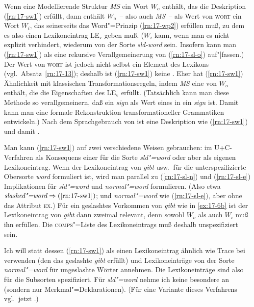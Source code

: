 \documentclass[output=paper]{LSP/langsci}
\begin{document}
\randnum\label{rn:17-82}Wenn eine Modellierende Struktur \textit{MS} ein Wort
$W_o$ enthält, das die Deskription (\ref{rn:17-sw1}) erfüllt, dann
enthält $W_o$~-- also auch \textit{MS}~-- als Wert von \textsc{wort} ein Wort
$W_i$, das seinerseits das Word"=Prinzip (\ref{rn:17-wp2}) erfüllen muß, zu dem es
also einen Lexikoneintrag LE$_\mathrm{v}$ geben muß. ($W_i$ kann, wenn man
es nicht explizit verhindert, wiederum von der Sorte \textit{sld-word}
sein. Insofern kann man (\ref{rn:17-sw1}) als eine rekursive Verallgemeinerung von
(\ref{rn:17-sl-o}) auf"|fassen.) Der Wert von \textsc{wort} ist jedoch nicht selbst
ein Element des Lexikons (vgl.\ Absatz~\ref{rn:17-13}); deshalb ist (\ref{rn:17-sw1}) keine
. Eher hat (\ref{rn:17-sw1}) Ähnlichkeit mit klassischen
Transformationsregeln, indem \textit{MS} eine 
von $W_o$ enthält, die die Eigenschaften des
 LE$_\mathrm{v}$
erfüllt. (Tatsächlich kann man diese Methode so verallgemeinern, daß
ein \textit{sign} als Wert eines  in ein \textit{sign}
 ist. Damit kann man eine formale Rekonstruktion
transformationeller Grammatiken entwickeln.) Nach dem Sprachgebrauch
von \citet[4]{PollardSag1994} ist eine Deskription wie (\ref{rn:17-sw1}) 
und damit .

\randnum\label{rn:17-83}Man kann (\ref{rn:17-sw1}) auf zwei verschiedene Weisen gebrauchen: im U+C-Verfahren als Konsequens einer  für die Sorte \textit{sld"=word} oder aber als eigenen Lexikoneintrag. Wenn der Lexikoneintrag von \textit{gibt} usw.\ für die unterspezifizierte Obersorte \textit{word} formuliert ist, wird man parallel zu (\ref{rn:17-sl-n}) und (\ref{rn:17-sl-e}) Implikationen für \textit{sld"=word} und \textit{normal"=word} formulieren. (Also etwa $\textit{slashed"=word} \Rightarrow \mathrm{(\ref{rn:17-sw1})}$; und \textit{normal"=word} wie (\ref{rn:17-sl-e}), aber ohne das Attribut \textsc{ex}.) Für ein geslashtes Vorkommen von \textit{gibt} wie in \eqref{ex:17-6b} ist der Lexikoneintrag von \textit{gibt} dann zweimal relevant, denn sowohl $W_o$ als auch $W_i$ muß ihn erfüllen. Die \textsc{comps}"=Liste des Lexikoneintrags muß deshalb unspezifiziert sein.

\randnum\label{rn:17-84}Ich will statt dessen (\ref{rn:17-sw1}) als einen Lexikoneintrag ähnlich wie Trace bei \citet{PollardSag1994} verwenden (den \zb das geslashte \textit{gibt} erfüllt) und
Lexikoneinträge von der Sorte \textit{normal"=word} für ungeslashte Wörter annehmen. Die Lexikoneinträge sind also für die Subsorten spezifiziert. Für \textit{sld"=word} nehme ich keine besondere  an (sondern nur Merkmal"=Deklarationen). (Für eine Variante dieses
Verfahrens vgl.\ jetzt \citealt[77--80]{Meurers94}.)
\end{document}
